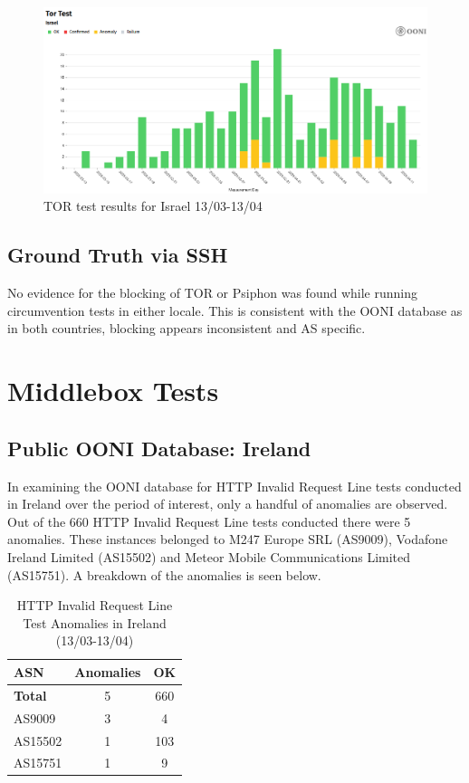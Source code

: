 \begin{figure} [H]
    \centering
    \includegraphics[width=0.5\linewidth]{ISROONITOR.png}
    \caption{TOR test results for Israel 13/03-13/04}
    \label{fig:enter-label}
\end{figure}

\subsection{Ground Truth via SSH}
No evidence for the blocking of TOR or Psiphon was found while running circumvention tests in either locale. This is consistent with the OONI database as in both countries, blocking appears inconsistent and AS specific.



\section{Middlebox Tests}
\subsection{Public OONI Database: Ireland}
In examining the OONI database for HTTP Invalid Request Line tests conducted in Ireland over the period of interest, only a handful of anomalies are observed. Out of the 660 HTTP Invalid Request Line tests conducted there were 5 anomalies. These instances belonged to M247 Europe SRL (AS9009), Vodafone Ireland Limited (AS15502) and Meteor Mobile Communications Limited (AS15751). A breakdown of the anomalies is seen below.

\begin{table}[H]
\centering
\caption{HTTP Invalid Request Line Test Anomalies in Ireland (13/03-13/04)}
\begin{tabular}{lcc}
\toprule
\textbf{ASN} & \textbf{Anomalies} & \textbf{OK} \\
\midrule
\textbf{Total}   & 5 & 660 \\
\midrule
AS9009           & 3 & 4 \\
AS15502          & 1 & 103 \\
AS15751          & 1 & 9 \\
\bottomrule
\end{tabular}
\label{tab:http_invalid_ireland}
\end{table}




